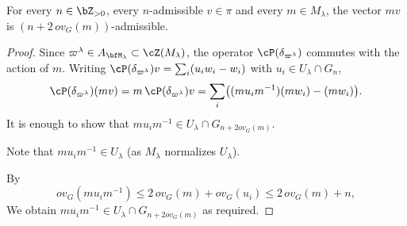 \documentclass[12pt,a4paper]{amsart}%
\newcommand{\RamiA}[1]{{{#1}}}
\begin{document}
\begin{lemma}\label{lem:adm.shift.M}
For every $n\in\Z_{>0}$, every $n$-admissible $v\in\pi$ and every $m\in M_\lambda$, the vector $mv$ is $(n+2\,ov_G(m))$-admissible.
\end{lemma}
\begin{proof}
Since $\varpi^\lambda\in A_{\bfM_\lambda}\subset \cZ(M_\lambda)$, the operator $\cP(\delta_{\varpi^\lambda})$ commutes with the action of $m$. Writing $\cP(\delta_{\varpi^\lambda})v=\sum_i(u_iw_i-w_i)$ with $u_i\in U_\lambda\cap G_n$,
$$
\cP(\delta_{\varpi^\lambda})(mv)=m\,\cP(\delta_{\varpi^\lambda})v=\sum_i\bigl((mu_im^{-1})(mw_i)-(mw_i)\bigr).
$$
\RamiA{It is enough to show that $mu_im^{-1}\in U_\lambda\cap G_{n+2ov_G(m)}$.}

\RamiA{Note that} $mu_im^{-1}\in U_\lambda$ (as $M_\lambda$ normalizes $U_\lambda$).

\RamiA{By} 
$$
ov_G(mu_im^{-1})\le 2\,ov_G(m)+ov_G(u_i)\le 2\,ov_G(m)+n,
$$
\RamiA{We obtain} $mu_im^{-1}\in U_\lambda\cap G_{n+2ov_G(m)}$ \RamiA{as required}. 
\end{proof}
\end{document}
